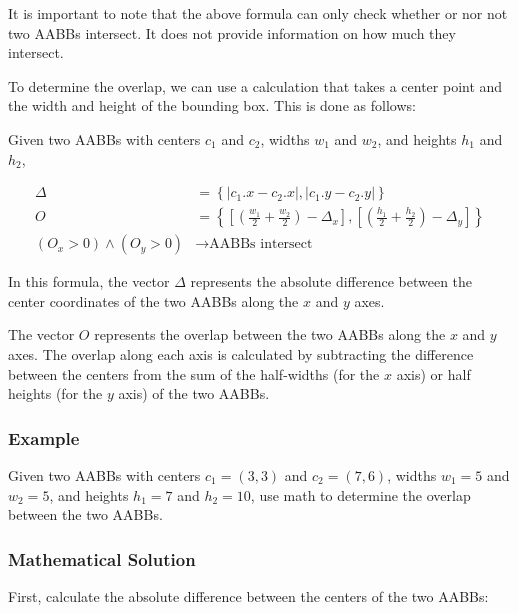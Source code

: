 It is important to note that the above formula can only check whether or nor
not two AABBs intersect. It does not provide information on how much they
intersect.

To determine the overlap, we can use a calculation that takes a center point
and the width and height of the bounding box. This is done as follows:

Given two AABBs with centers $c_1$ and $c_2$, widths $w_1$ and $w_2$, and
heights $h_1$ and $h_2$,

\begin{equation}
    \begin{aligned}
        \Delta                        & = \left\{ \left| c_1.x - c_2.x \right| , \left| c_1.y - c_2.y \right| \right\}                                                                                     \\
        O                             & = \left\{ \left[ \left( \frac{w_1}{2} + \frac{w_2}{2} \right) - \Delta_x \right] , \left[ \left( \frac{h_1}{2} + \frac{h_2}{2} \right) - \Delta_y \right] \right\} \\
        ( O_x > 0 ) \land ( O_y > 0 ) & \rightarrow \text{AABBs intersect}
    \end{aligned}
\end{equation}

In this formula, the vector $\Delta$ represents the absolute difference between
the center coordinates of the two AABBs along the $x$ and $y$ axes.

The vector $O$ represents the overlap between the two AABBs along the $x$ and
$y$ axes. The overlap along each axis is calculated by subtracting the
difference between the centers from the sum of the half-widths (for the $x$
axis) or half heights (for the $y$ axis) of the two AABBs.

\subsubsection{Example}

Given two AABBs with centers $c_1 = (3, 3)$ and $c_2 = (7, 6)$, widths $w_1 =
    5$ and $w_2 = 5$, and heights $h_1 = 7$ and $h_2 = 10$, use math to determine
the overlap between the two AABBs.

\subsubsection{Mathematical Solution}

First, calculate the absolute difference between the centers of the two AABBs:

